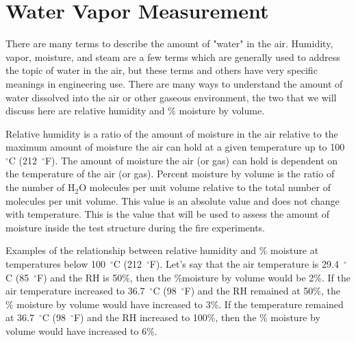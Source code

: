 \documentclass[12pt,oneside]{book}
\begin{document}




\section{Water Vapor Measurement}
There are many terms to describe the amount of "water" in the air.  Humidity, vapor, moisture, and steam are a few terms which are generally used to address the topic of water in the air, but these terms and others have very specific meanings in engineering use.  There are many ways to understand the amount of water dissolved into the air or other gaseous environment, the two that we will discuss here are relative humidity and \% moisture by volume.  

Relative humidity is a ratio of the amount of moisture in the air relative to the maximum amount of moisture the air can hold at a given temperature up to 100~$^\circ$C (212~$^\circ$F).  The amount of moisture the air (or gas) can hold is dependent on the temperature of the air (or gas).  Percent moisture by volume is the ratio of the number of H$_{2}$O molecules per unit volume relative to the total number of molecules per unit volume.  This value is an absolute value and does not change with temperature.  This is the value that will be used to assess the amount of moisture inside the test structure during the fire experiments.  

Examples of the relationship between relative humidity and \% moisture at temperatures below 100~$^\circ$C (212~$^\circ$F).  Let's say that the air temperature is 29.4~$^\circ$C (85~$^\circ$F) and the RH is 50\%, then the \%moisture by volume would be 2\%.   If the air temperature increased to 36.7~$^\circ$C (98~$^\circ$F) and the RH remained at 50\%, the \% moisture by volume would have increased to 3\%.  If the temperature remained at 36.7~$^\circ$C (98~$^\circ$F) and the RH increased to 100\%, then the \% moisture by volume would have increased to 6\%. 
\end{document}
